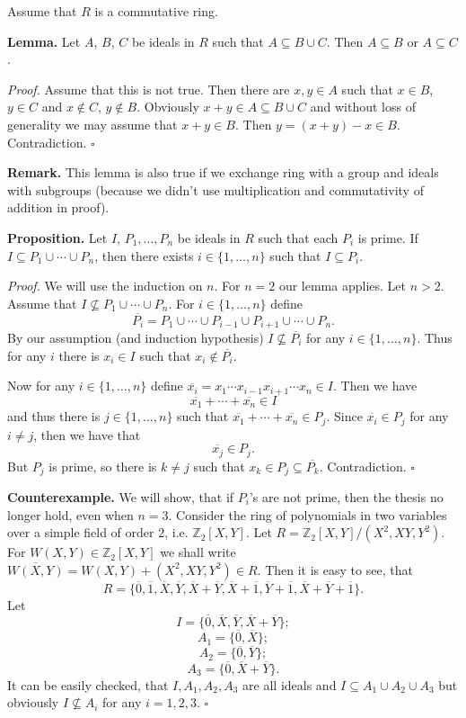 \documentclass[12pt]{article}
\begin{document}
Assume that $R$ is a commutative ring.

\textbf{Lemma.} Let $A$, $B$, $C$ be ideals in $R$ such that $A\subseteq B\cup C$. Then $A\subseteq B$ or $A\subseteq C$.

\textit{Proof.} Assume that this is not true. Then there are $x,y\in A$ such that $x\in B$, $y\in C$ and $x\not\in C$, $y\not\in B$. Obviously $x+y\in A\subseteq B\cup C$ and without loss of generality we may assume that $x+y\in B$. Then $y=(x+y)-x\in B$. Contradiction. $\square$

\textbf{Remark.} This lemma is also true if we exchange ring with a group and ideals with subgroups (because we didn't use multiplication and commutativity of addition in proof).

\textbf{Proposition.} Let $I$, $P_1,\ldots, P_n$ be ideals in $R$ such that each $P_i$ is prime. If $I\subseteq P_1\cup\cdots\cup P_n$, then there exists $i\in\{1,\ldots,n\}$ such that $I\subseteq P_i$.

\textit{Proof.} We will use the induction on $n$. For $n=2$ our lemma applies. Let $n>2$. Assume that $I\not\subseteq P_1\cup\cdots\cup P_n$. For $i\in\{1,\ldots, n\}$ define $$\overline{P_i}=P_1\cup\cdots\cup P_{i-1}\cup P_{i+1}\cup\cdots\cup P_n.$$ By our assumption (and induction hypothesis) $I\not\subseteq \overline{P_i}$ for any $i\in\{1,\ldots, n\}$. Thus for any $i$ there is $x_i\in I$ such that $x_i\not\in\overline{P_i}$.

Now for any $i\in\{1,\ldots, n\}$ define $\overline{x_i}=x_1\cdots x_{i-1} x_{i+1}\cdots x_n\in I$. Then we have
$$\overline{x_1}+\cdots +\overline{x_n}\in I$$
and thus there is $j\in\{1,\ldots, n\}$ such that $\overline{x_1}+\cdots +\overline{x_n}\in P_j$. Since $\overline{x_i}\in P_j$ for any $i\neq j$, then we have that $$\overline{x_j}\in P_j.$$ But $P_j$ is prime, so there is $k\neq j$ such that $x_k\in P_j\subseteq \overline{P_k}$. Contradiction. $\square$

\textbf{Counterexample.} We will show, that if $P_i$'s are not prime, then the thesis no longer hold, even when $n=3$. Consider the ring of polynomials in two variables over a simple field of order $2$, i.e. $\mathbb{Z}_{2}[X,Y]$. Let $R=\mathbb{Z}_{2}[X,Y]/(X^2, XY, Y^2)$. For $W(X,Y)\in \mathbb{Z}_{2}[X,Y]$ we shall write $\overline{W(X,Y)}=W(X,Y)+(X^2,XY,Y^2)\in R$. Then it is easy to see, that
$$R=\{ \overline{0}, \overline{1}, \overline{X}, \overline{Y}, \overline{X}+\overline{Y}, \overline{X}+\overline{1}, \overline{Y}+\overline{1}, \overline{X}+\overline{Y}+\overline{1}\}.$$
Let $$I=\{\overline{0}, \overline{X}, \overline{Y}, \overline{X}+\overline{Y}\};$$ $$A_1=\{\overline{0}, \overline{X}\};$$ $$A_2=\{\overline{0}, \overline{Y}\};$$ $$A_3=\{\overline{0}, \overline{X}+\overline{Y}\}.$$ It can be easily checked, that $I, A_1, A_2, A_3$ are all ideals and $I\subseteq A_1\cup A_2\cup A_3$ but obviously $I\not\subseteq A_i$ for any $i=1,2,3$. $\square$
\end{document}
